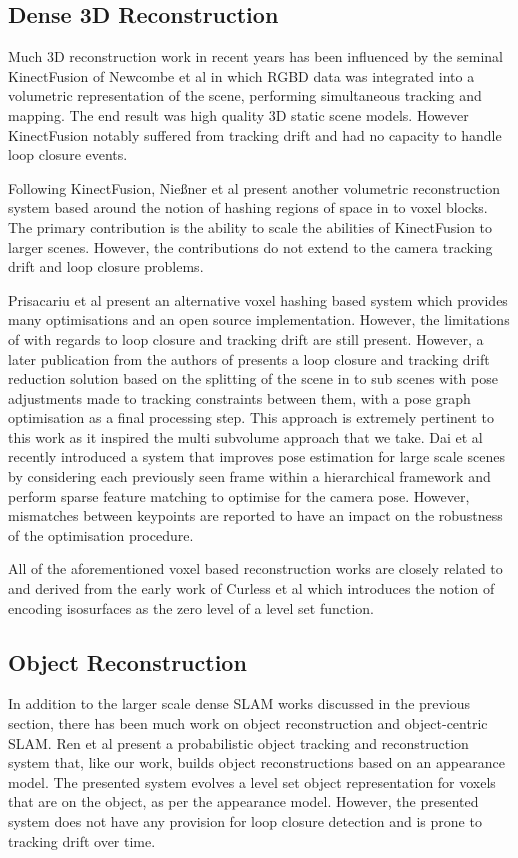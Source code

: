 \subsection{Dense 3D Reconstruction}
Much 3D reconstruction work in recent years has been influenced by the seminal KinectFusion \cite{Newcombe2011} of Newcombe et al in which
RGBD data was integrated into a volumetric representation of the scene, performing simultaneous tracking and mapping. The end result was
high quality 3D static scene models. 
However KinectFusion notably suffered from tracking drift and had no capacity to handle loop closure
events.

Following KinectFusion, Nie{\ss}ner et al present another volumetric reconstruction system \cite{Niessner2013} based around the notion of
hashing regions of space in to voxel blocks. The primary contribution is the ability to scale the abilities of KinectFusion to larger
scenes. However, the contributions do not extend to the camera tracking drift and loop closure problems.

Prisacariu et al present an alternative voxel hashing based system \cite{Prisacariu2014} which provides many optimisations and an open source 
implementation. However, the limitations of \cite{Newcombe2011,Niessner2013} with regards to loop closure and tracking drift are still present. 
However, a later publication \cite{Kahler2016} from the authors of \cite{Prisacariu2014} presents a loop closure and tracking drift reduction 
solution based on the splitting of the scene in to sub scenes with pose adjustments made to tracking constraints between them, with 
a pose graph optimisation as a final processing step. This approach is extremely pertinent to this work as it inspired the multi subvolume approach 
that we take. Dai et al recently introduced a system that improves pose estimation for large scale scenes by considering each previously seen frame within a hierarchical framework and perform sparse feature matching to optimise for the camera pose. However, mismatches between keypoints are reported to have an impact on the robustness of the optimisation procedure.

All of the aforementioned voxel based reconstruction works are closely related to and derived from the early work of Curless et al \cite{Curless1996} 
which introduces the notion of encoding isosurfaces as the zero level of a level set function.

\subsection{Object Reconstruction}
In addition to the larger scale dense SLAM works discussed in the previous section, there has been much work on object reconstruction and 
object-centric SLAM. Ren et al \cite{Ren2013} present a probabilistic object tracking and reconstruction system that, like our work, builds 
object reconstructions based on an appearance model. The presented system evolves a level set object representation for voxels that 
are on the object, as per the appearance model. However, the presented system does not have any provision for loop closure detection and 
is prone to tracking drift over time.

